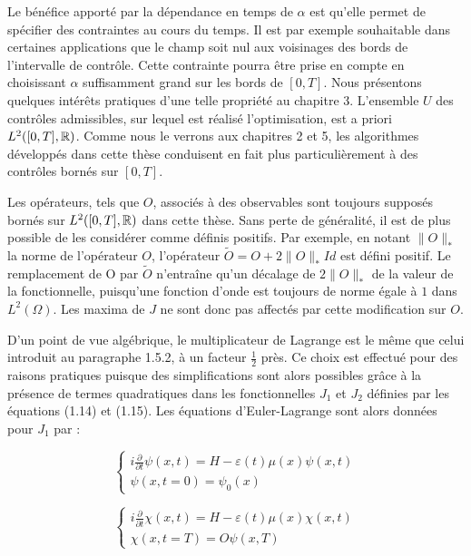 $ $
\\Le bénéfice apporté par la dépendance en temps de $\alpha$ est qu'elle permet de spécifier des contraintes au cours du temps. Il est par exemple souhaitable dans certaines applications que le champ soit nul aux voisinages des bords de l'intervalle de contrôle. Cette contrainte pourra être prise en compte en choisissant $\alpha$ suffisamment grand sur les bords de $[0, T ]$. Nous présentons quelques intérêts pratiques d’une telle propriété au chapitre 3. L'ensemble $U$ des contrôles admissibles, sur lequel est réalisé l'optimisation, est a priori $L^2 ([0, T ], \mathbb R)$. Comme nous le verrons aux chapitres 2 et 5, les algorithmes développés dans cette thèse conduisent en fait plus particulièrement à des contrôles bornés sur $[0, T]$.

\begin{remark}

Les opérateurs, tels que $O$, associés à des observables sont toujours supposés bornés sur $L^2 ([0, T ], \mathbb R)$ dans cette thèse. Sans perte de généralité, il est de plus possible de les considérer comme définis positifs. Par exemple, en notant $\lVert O \rVert_*$ la norme de l'opérateur $O$, l’opérateur $\tilde{O} = O + 2\lVert O \rVert_* Id$ est défini positif. Le remplacement de O par $\tilde{O}$ n’entraîne qu'un décalage de $ 2 \lVert O \rVert_*$ de la valeur de la fonctionnelle, puisqu'une fonction d'onde est toujours de norme égale à $1$ dans $L^2 (\Omega)$. Les maxima de $J$ ne sont donc pas affectés par cette modification sur $O$.

\end{remark}

D’un point de vue algébrique, le multiplicateur de Lagrange est le même que celui introduit au paragraphe 1.5.2, à un facteur $\frac{1}{2} $ près. Ce choix est effectué pour des raisons pratiques puisque des simplifications sont alors possibles grâce à la présence de termes quadratiques dans les fonctionnelles $J_1$ et $J_2$ définies par les équations (1.14) et (1.15). Les équations d'Euler-Lagrange sont alors données pour $J_1$ par :

\begin{equation}
\begin{cases}
i \frac{\partial}{\partial t} \psi (x,t) = H - \varepsilon(t)\mu(x)\psi(x,t)\\
\psi(x,t=0)=\psi_0(x)
\end{cases}
\end{equation}

\begin{equation}
\begin{cases}
i \frac{\partial}{\partial t} \chi (x,t) = H - \varepsilon(t)\mu(x)\chi(x,t)\\
\chi(x,t=T)=O\psi(x,T)
\end{cases}
\end{equation}


